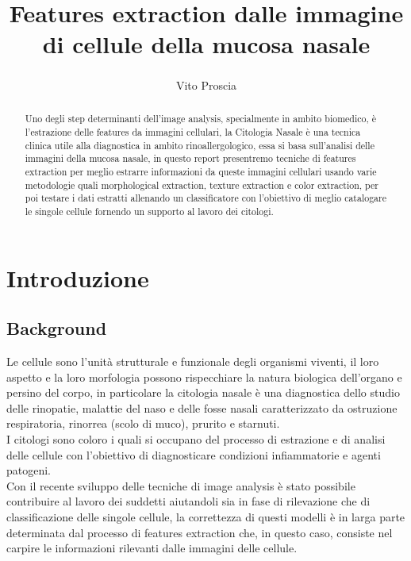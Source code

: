 \documentclass[italian,10pt,a4paper]{article}
\title{Features extraction dalle immagine di cellule della mucosa nasale}
\author{Vito Proscia\href{v.proscia3@studenti.uniba.it}{\textsuperscript{\Letter}}}
\date{} %
\begin{document}
	\maketitle
	
	\begin{abstract}
		Uno degli step determinanti dell'image analysis, specialmente in ambito biomedico, è l'estrazione delle features da immagini cellulari, la Citologia Nasale è una tecnica clinica utile alla diagnostica in ambito rinoallergologico, essa si basa sull'analisi delle immagini della mucosa nasale, in questo report presentremo tecniche di features extraction per meglio estrarre informazioni da queste immagini cellulari usando varie metodologie quali morphological extraction, texture extraction e color extraction, per poi testare i dati estratti allenando un classificatore con l'obiettivo di meglio catalogare le singole cellule fornendo un supporto al lavoro dei citologi.  
	\end{abstract}
	
	\section{Introduzione}
		
		\subsection{Background}
		
			Le cellule sono l'unità strutturale e funzionale degli organismi viventi, il loro aspetto e la loro morfologia possono rispecchiare la natura biologica dell'organo e persino del corpo, in particolare la citologia nasale è una diagnostica dello studio delle rinopatie, malattie del naso e delle fosse nasali caratterizzato da ostruzione respiratoria, rinorrea (scolo di muco), prurito e starnuti.\\	
			I citologi sono coloro i quali si occupano del processo di estrazione e di analisi delle cellule con l'obiettivo di diagnosticare condizioni infiammatorie e agenti patogeni.\\
			\linebreak
			Con il recente sviluppo delle tecniche di image analysis è stato possibile contribuire al lavoro dei suddetti aiutandoli sia in fase di rilevazione che di classificazione delle singole cellule, la correttezza di questi modelli è in larga parte determinata dal processo di features extraction che, in questo caso, consiste nel carpire le informazioni rilevanti dalle immagini delle cellule.
			
\end{document}
